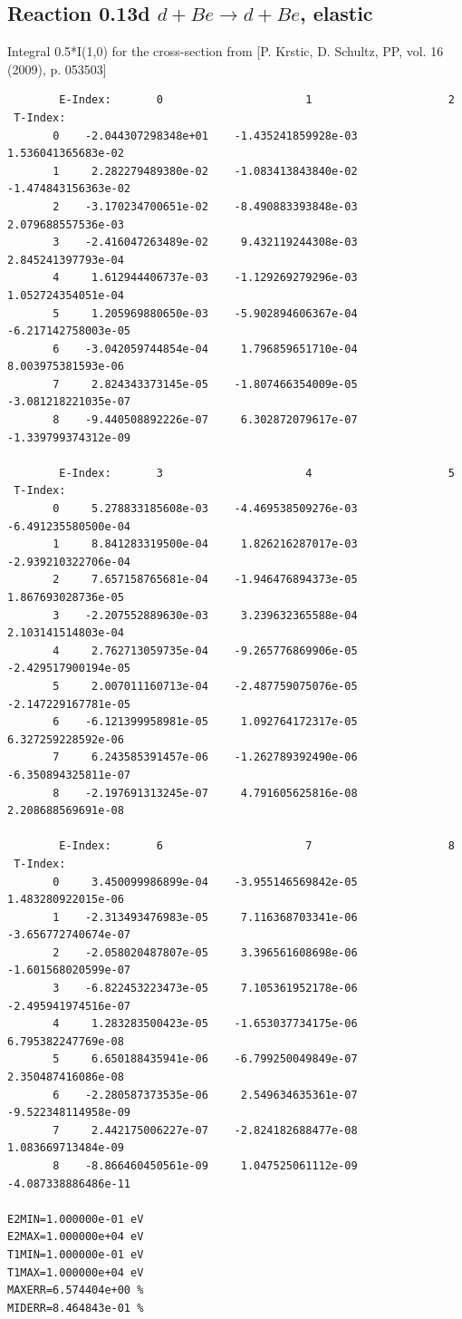\documentclass[12pt,dvipdfmx]{article}
\begin{document}
\subsection{
Reaction 0.13d  $d + Be \rightarrow d + Be$, elastic}

Integral 0.5*I(1,0) for the cross-section from [P. Krstic, D. Schultz, PP, vol. 16 (2009), p. 053503]

\begin{small}\begin{verbatim}
        E-Index:       0                      1                     2
 T-Index:
       0    -2.044307298348e+01    -1.435241859928e-03     1.536041365683e-02
       1     2.282279489380e-02    -1.083413843840e-02    -1.474843156363e-02
       2    -3.170234700651e-02    -8.490883393848e-03     2.079688557536e-03
       3    -2.416047263489e-02     9.432119244308e-03     2.845241397793e-04
       4     1.612944406737e-03    -1.129269279296e-03     1.052724354051e-04
       5     1.205969880650e-03    -5.902894606367e-04    -6.217142758003e-05
       6    -3.042059744854e-04     1.796859651710e-04     8.003975381593e-06
       7     2.824343373145e-05    -1.807466354009e-05    -3.081218221035e-07
       8    -9.440508892226e-07     6.302872079617e-07    -1.339799374312e-09

        E-Index:       3                      4                     5
 T-Index:
       0     5.278833185608e-03    -4.469538509276e-03    -6.491235580500e-04
       1     8.841283319500e-04     1.826216287017e-03    -2.939210322706e-04
       2     7.657158765681e-04    -1.946476894373e-05     1.867693028736e-05
       3    -2.207552889630e-03     3.239632365588e-04     2.103141514803e-04
       4     2.762713059735e-04    -9.265776869906e-05    -2.429517900194e-05
       5     2.007011160713e-04    -2.487759075076e-05    -2.147229167781e-05
       6    -6.121399958981e-05     1.092764172317e-05     6.327259228592e-06
       7     6.243585391457e-06    -1.262789392490e-06    -6.350894325811e-07
       8    -2.197691313245e-07     4.791605625816e-08     2.208688569691e-08

        E-Index:       6                      7                     8
 T-Index:
       0     3.450099986899e-04    -3.955146569842e-05     1.483280922015e-06
       1    -2.313493476983e-05     7.116368703341e-06    -3.656772740674e-07
       2    -2.058020487807e-05     3.396561608698e-06    -1.601568020599e-07
       3    -6.822453223473e-05     7.105361952178e-06    -2.495941974516e-07
       4     1.283283500423e-05    -1.653037734175e-06     6.795382247769e-08
       5     6.650188435941e-06    -6.799250049849e-07     2.350487416086e-08
       6    -2.280587373535e-06     2.549634635361e-07    -9.522348114958e-09
       7     2.442175006227e-07    -2.824182688477e-08     1.083669713484e-09
       8    -8.866460450561e-09     1.047525061112e-09    -4.087338886486e-11

E2MIN=1.000000e-01 eV
E2MAX=1.000000e+04 eV
T1MIN=1.000000e-01 eV
T1MAX=1.000000e+04 eV
MAXERR=6.574404e+00 %
MIDERR=8.464843e-01 %
\end{verbatim}\end{small}
\newpage
\end{document}
